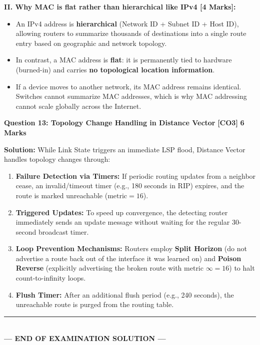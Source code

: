 \documentclass[11pt,a4paper]{article}
\newcommand{\questionheader}[3]{
    \vspace{0.35cm}
    \noindent\colorbox{qboxbg}{
        \parbox{\dimexpr\textwidth-2\fboxsep\relax}{
            \textbf{\textcolor{primary}{\large #1}} \hfill \textbf{\textcolor{accent}{[#2]}} \hfill \textbf{\textcolor{secondary}{#3 Marks}}
        }
    }
    \vspace{0.15cm}
}
\begin{document}
\textbf{II. Why MAC is flat rather than hierarchical like IPv4 [4 Marks]:}
\begin{itemize}
    \item An IPv4 address is \textbf{hierarchical} (Network ID + Subnet ID + Host ID), allowing routers to summarize thousands of destinations into a single route entry based on geographic and network topology.
    \item In contrast, a MAC address is \textbf{flat}: it is permanently tied to hardware (burned-in) and carries \textbf{no topological location information}.
    \item If a device moves to another network, its MAC address remains identical. Switches cannot summarize MAC addresses, which is why MAC addressing cannot scale globally across the Internet.
\end{itemize}

\questionheader{Question 13: Topology Change Handling in Distance Vector}{CO3}{6}

\textbf{Solution:}
While Link State triggers an immediate LSP flood, Distance Vector handles topology changes through:
\begin{enumerate}
    \item \textbf{Failure Detection via Timers:} If periodic routing updates from a neighbor cease, an invalid/timeout timer (e.g., 180 seconds in RIP) expires, and the route is marked unreachable ($\text{metric} = 16$).
    \item \textbf{Triggered Updates:} To speed up convergence, the detecting router immediately sends an update message without waiting for the regular 30-second broadcast timer.
    \item \textbf{Loop Prevention Mechanisms:} Routers employ \textbf{Split Horizon} (do not advertise a route back out of the interface it was learned on) and \textbf{Poison Reverse} (explicitly advertising the broken route with metric $\infty = 16$) to halt count-to-infinity loops.
    \item \textbf{Flush Timer:} After an additional flush period (e.g., 240 seconds), the unreachable route is purged from the routing table.
\end{enumerate}

\begin{center}
    \rule{\textwidth}{0.8pt}\\[3pt]
    \textbf{\textcolor{primary}{--- END OF EXAMINATION SOLUTION ---}}
\end{center}
\end{document}
